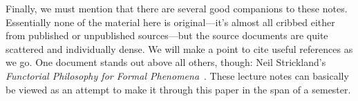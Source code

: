 Finally, we must mention that there are several good companions to these notes.  Essentially none of the material here is original---it's almost all cribbed either from published or unpublished sources---but the source documents are quite scattered and individually dense.  We will make a point to cite useful references as we go.  One document stands out above all others, though: Neil Strickland's \textit{Functorial Philosophy for Formal Phenomena}~\cite{StricklandFPFP}.  These lecture notes can basically be viewed as an attempt to make it through this paper in the span of a semester.
